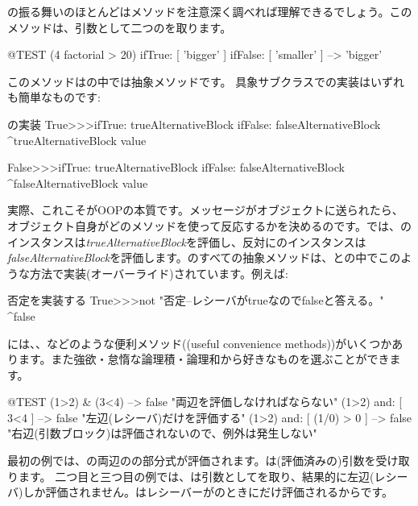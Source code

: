 \documentclass[a4paper,10pt,twoside]{book}
\begin{document}
の振る舞いのほとんどはメソッドを注意深く調べれば理解できるでしょう。このメソッドは、引数として二つのを取ります。

\begin{code}{@TEST}
(4 factorial > 20) ifTrue: [ 'bigger' ] ifFalse: [ 'smaller' ] --> 'bigger'
\end{code}

このメソッドはの中では抽象メソッドです。
具象サブクラスでの実装はいずれも簡単なものです:

\begin{method}{の実装}
True>>>ifTrue: trueAlternativeBlock ifFalse: falseAlternativeBlock 
    ^trueAlternativeBlock value

False>>>ifTrue: trueAlternativeBlock ifFalse: falseAlternativeBlock 
    ^falseAlternativeBlock value
\end{method}

実際、これこそがOOPの本質です。メッセージがオブジェクトに送られたら、オブジェクト自身がどのメソッドを使って反応するかを決めるのです。では、のインスタンスは\emph{trueAlternativeBlock}を評価し、反対にのインスタンスは\emph{falseAlternativeBlock}を評価します。のすべての抽象メソッドは、との中でこのような方法で実装(オーバーライド)されています。例えば:

\begin{method}{否定を実装する}
True>>>not
    "否定--レシーバがtrueなのでfalseと答える。"
    ^false
\end{method}

には、、などのような便利メソッド((useful convenience methods))がいくつかあります。また強欲・怠惰な論理積・論理和から好きなものを選ぶことができます。

\begin{code}{@TEST}
(1>2) & (3<4)              --> false    "両辺を評価しなければならない"
(1>2) and: [ 3<4 ]        --> false    "左辺(レシーバ)だけを評価する"
(1>2) and: [ (1/0) > 0 ] --> false    "右辺(引数ブロック)は評価されないので、例外は発生しない"
\end{code}

最初の例では、の両辺のの部分式が評価されます。\ct{&}は(評価済みの)引数を受け取ります。
二つ目と三つ目の例では、は引数としてを取り、結果的に左辺(レシーバ)しか評価されません。はレシーバーがのときにだけ評価されるからです。
\end{document}
